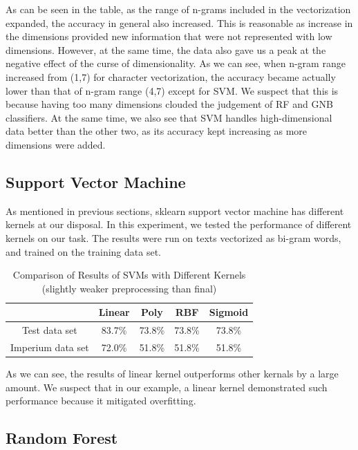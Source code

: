 \documentclass[11pt]{article}
\begin{document}
As can be seen in the table, as the range of n-grams included in the
vectorization expanded, the accuracy in general also increased. This is
reasonable as increase in the dimensions provided new information that were not
represented with low dimensions. However, at the same time, the data also gave
us a peak at the negative effect of the curse of dimensionality. As we can see,
when n-gram range increased from (1,7) for character vectorization, the
accuracy became actually lower than that of n-gram range (4,7) except for SVM.
We suspect that this is because having too many dimensions clouded the
judgement of RF and GNB classifiers. At the same time, we also see that SVM
handles high-dimensional data better than the other two, as its accuracy kept
increasing as more dimensions were added.

\subsection{Support Vector Machine}

As mentioned in previous sections, sklearn support vector machine has different
kernels at our disposal. In this experiment, we tested the performance of
different kernels on our task. The results were run on texts vectorized as
bi-gram words, and trained on the training data set.

\begin{table}[h]
    \centering
     \begin{tabular}{|c| c c c c|} 
     \hline
      & Linear & Poly & RBF & Sigmoid \\ [0.5ex] 
     \hline
     Test data set & 83.7\% &73.8\% & 73.8\% & 73.8\%\\ 
     \hline
     Imperium data set & 72.0\% & 51.8\% & 51.8\%& 51.8\% \\
     \hline
    \end{tabular}
    \caption{Comparison of Results of SVMs with Different Kernels (slightly weaker
                preprocessing than final)}
\end{table}

As we can see, the results of linear kernel outperforms other kernals by a
large amount. We suspect that in our example, a linear kernel demonstrated such
performance because it mitigated overfitting.

\subsection{Random Forest}
\end{document}
